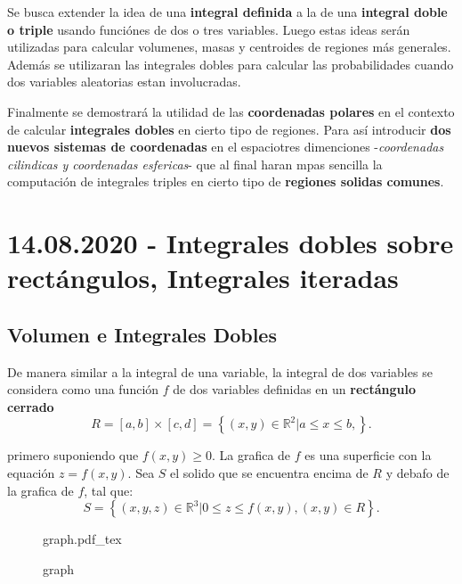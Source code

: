 \documentclass[a4paper]{book}
\newcommand{\incfig}[2][1]{%
    \def\svgwidth{#1\columnwidth}
    {#2.pdf_tex}
}
\begin{document}
Se busca extender la idea de una \textbf{integral definida} a la de una
\textbf{integral doble o triple} usando funciónes de dos o tres variables.
Luego estas ideas serán utilizadas para calcular volumenes, masas y centroides
de regiones más generales. Además se utilizaran las integrales dobles para
calcular las probabilidades cuando dos variables aleatorias estan involucradas.

Finalmente se demostrará la utilidad de las  \textbf{coordenadas polares} en el
contexto de calcular \textbf{integrales dobles} en cierto tipo de regiones.
Para así introducir \textbf{dos nuevos sistemas de coordenadas} en el
espaciotres dimenciones -\emph{coordenadas cilindicas y coordenadas esfericas}-
que al final haran mpas sencilla la computación de integrales triples en cierto
tipo de \textbf{regiones solidas comunes}.


\section{14.08.2020 - Integrales dobles sobre rectángulos, Integrales iteradas}
\label{sec:integrales_dobles_sobre_rectangulos_integrales_iteradas}

\subsection{Volumen e Integrales Dobles}
\label{ssec:volumen_e_integrales_dobles}

De manera similar a la integral de una variable, la integral de dos variables
se considera como una función  \(f\) de dos variables definidas en un
\textbf{rectángulo cerrado}
\[
    R=\left[a,b\right] \times \left[ c,d \right] = \left\{ \left( x,y \right)\in\mathbb{R}^{2}|a\le x \le b, \right\}
.\]

primero suponiendo que \(f\left(x,y\right)\ge 0\). La grafica de \(f\) es una
superficie con la equación \(z=f\left( x,y \right)\). Sea \(S\) el solido que
se encuentra encima de \(R\) y debafo de la grafica de \(f\), tal que:
\[
S=\left\{\left(x,y,z\right)\in\mathbb{R}^{3}|0\le z \le f\left(x,y\right),\left( x,y \right) \in R \right\}
.\]

\begin{figure}[ht]
    \centering
    \incfig{graph}
    \caption{graph}
    \label{fig:graph}
\end{figure}
\end{document}
